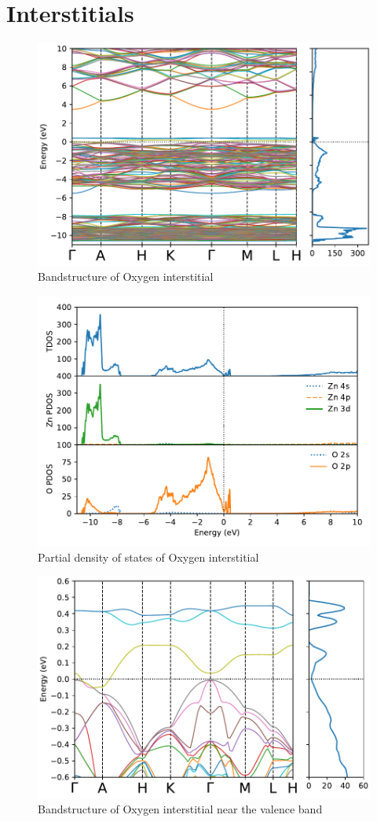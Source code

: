 \clearpage

\section{Interstitials}

\begin{figure}[tbh!]
	\centering
	\includegraphics[width=0.7\linewidth]{"images/rnd/band-dos_O_i"}
	\caption[Bandstructure of Oxygen interstitial]{Bandstructure of Oxygen interstitial}
\end{figure}

\begin{figure}[tbh!]
	\centering
	\includegraphics[width=0.7\linewidth]{"images/rnd/dos-pdos_O_i"}
	\caption[Partial density of states of Oxygen interstitial]{Partial density of states of Oxygen interstitial}
\end{figure}

\begin{figure}[tbh!]
	\centering
	\includegraphics[width=0.7\linewidth]{"images/rnd/band-dos-close_O_i"}
	\caption[Bandstructure of Oxygen interstitial near the valence band]{Bandstructure of Oxygen interstitial near the valence band}
\end{figure}


